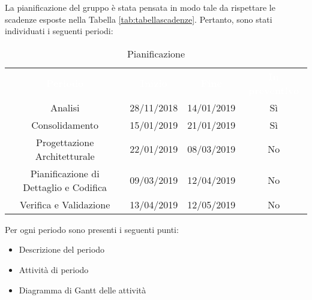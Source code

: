 La pianificazione del gruppo \gruppo \space è stata pensata in modo tale da rispettare le scadenze esposte nella Tabella \ref{tab:tabellascadenze}.\newline
Pertanto, sono stati individuati i seguenti periodi:

\renewcommand{\arraystretch}{1.5}
\begin{table}[H]	
	\begin{center}
	    \begin{tabular}{| c | c | c | c |}
	        \hline
	        \rowcolor{greySWEight}
	        \textcolor{white}{\textbf{Periodo}} & \textcolor{white}{\textbf{Inizio}}& \textcolor{white}{\textbf{Fine}}&\textcolor{white}{\textbf{In preventivo}}\\
	        Analisi & 28/11/2018 & 14/01/2019&Sì\\
	        Consolidamento & 15/01/2019 & 21/01/2019&Sì\\
	        Progettazione Architetturale & 22/01/2019 & 08/03/2019&No\\
	        Pianificazione di Dettaglio e Codifica & 09/03/2019 & 12/04/2019&No\\
	        Verifica e Validazione & 13/04/2019 & 12/05/2019&No\\
	        \hline
	    \end{tabular}
	    \caption{Pianificazione} \label{tab:pianificazione} 
	\end{center}
\end{table}


Per ogni periodo sono presenti i seguenti punti:
\begin{itemize}
	\item Descrizione del periodo
	\item Attività di periodo
	\item Diagramma di Gantt delle attività
\end{itemize}